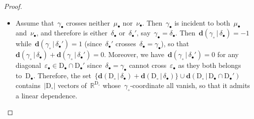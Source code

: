 \documentclass{amsart}
\theoremstyle{definition}
\newcommand{\R}{\mathbb{R}} %
\newcommand{\dissection}{\mathrm{D}} %
\newcommand{\dvector}[2]{\mathbf{d}(#1 \,|\, #2)} %
\begin{document}
\begin{proof}
\begin{itemize}
\item Assume that~$\gamma_\bullet$ crosses neither~$\mu_\bullet$ nor~$\nu_\bullet$. Then~$\gamma_\bullet$ is incident to both~$\mu_\bullet$ and~$\nu_\bullet$, and therefore is either~$\delta_\bullet$ or~$\delta_\bullet'$, say~$\gamma_\bullet = \delta_\bullet$. Then~$\dvector{\gamma_\circ}{\delta_\bullet} = -1$ while~$\dvector{\gamma_\circ}{\delta_\bullet'} = 1$ (since~$\delta_\bullet'$ crosses~$\delta_\bullet = \gamma_\bullet$), so that~$\dvector{\gamma_\circ}{\delta_\bullet} + \dvector{\gamma_\circ}{\delta_\bullet'} = 0$. Moreover, we have~$\dvector{\gamma_\circ}{\delta_\bullet'} = 0$ for any diagonal~$\varepsilon_\bullet \in \dissection_\bullet \cap \dissection_\bullet'$ since~$\delta_\bullet = \gamma_\bullet$ cannot cross~$\varepsilon_\bullet$ as they both belongs to~$\dissection_\bullet$. Therefore, the set~$\big\{ \dvector{\dissection_\circ}{\delta_\bullet} + \dvector{\dissection_\circ}{\delta_\bullet} \big\} \cup \dvector{\dissection_\circ}{\dissection_\bullet \cap \dissection_\bullet'}$ contains~$|\dissection_\circ|$ vectors of~$\R^{\dissection_\circ}$ whose~$\gamma_\circ$-coordinate all vanish, so that it admits a linear dependence.\\[-.3cm]


\end{itemize}
\end{proof}
\end{document}

